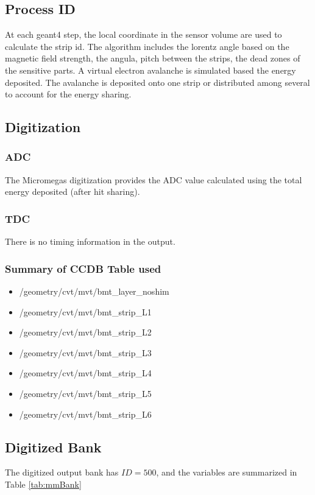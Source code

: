 \subsection{Process ID}
At each geant4 step, the local coordinate in the sensor volume are used to calculate the strip id.
The algorithm includes the lorentz angle based on the magnetic field strength, the angula, pitch between the strips,
the dead zones of the sensitive parts. A virtual electron avalanche is simulated based the energy deposited. The avalanche
is deposited onto one strip or distributed among several to account for the energy sharing.



\subsection{Digitization}

\subsubsection{ADC}
The Micromegas digitization provides the ADC value calculated using the total energy deposited (after hit sharing).


\subsubsection{TDC}
There is no timing information in the output.

\subsubsection{Summary of CCDB Table used}

\begin{itemize}
	\item /geometry/cvt/mvt/bmt\_layer\_noshim
	\item /geometry/cvt/mvt/bmt\_strip\_L1
	\item /geometry/cvt/mvt/bmt\_strip\_L2
	\item /geometry/cvt/mvt/bmt\_strip\_L3
	\item /geometry/cvt/mvt/bmt\_strip\_L4
	\item /geometry/cvt/mvt/bmt\_strip\_L5
	\item /geometry/cvt/mvt/bmt\_strip\_L6
\end{itemize}


\subsection{Digitized Bank}
The digitized output bank has $ID=500$, and the variables are summarized in Table \ref{tab:mmBank}

